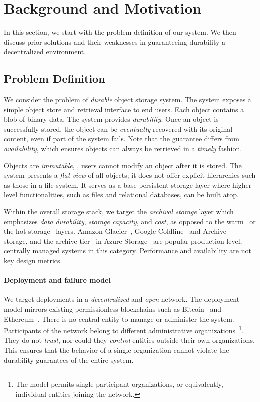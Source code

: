 \section{Background and Motivation}
\label{sec:background}

In this section, we start with the problem definition of our system.
We then discuss prior solutions and their weaknesses in guaranteeing durability a decentralized environment.

\subsection{Problem Definition}
\label{sec:background:problem}

We consider the problem of \emph{durable} object storage system.
The system exposes a simple object store and retrieval interface to end users.
Each object contains a blob of binary data.
The system provides \emph{durability}: Once an object is successfully stored, the object can be \emph{eventually} recovered with its original content, even if part of the system fails.
Note that the guarantee differs from \emph{availability}, which ensures objects can always be retrieved in a \emph{timely} fashion.

Objects are \emph{immutable}, \ie, users cannot modify an object after it is stored.
The system presents a \emph{flat view} of all objects;
it does not offer explicit hierarchies such as those in a file system.
It serves as a base persistent storage layer where higher-level functionalities, such as files and relational databases, can be built atop.

Within the overall storage stack, we target the \emph{archival storage} layer which emphasizes \emph{data durability}, \emph{storage capacity}, and \emph{cost}, as opposed to the warm~\cite{f4} or the hot storage~\cite{haystack} layers.
Amazon Glacier~\cite{amazon_glacier,amazon_s3}, Google Coldline~\cite{google_coldline} and Archive~\cite{google_archive} storage, and the archive tier~\cite{azure_tier} in Azure Storage~\cite{azure_storage} are popular production-level, centrally managed systems in this category.
Performance and availability are not key design metrics.

\paragraph{\textbf{Deployment and failure model}}
We target deployments in a \emph{decentralized} and \emph{open} network.
The deployment model mirrors existing permissionless blockchains such as Bitcoin~\cite{bitcoin} and Ethereum~\cite{ethereum}.
There is no central entity to manage or administer the system.
Participants of the network belong to different administrative organizations~\footnote{The model permits single-participant-organizations, or equivalently, individual entities joining the network.}.
They do not \emph{trust}, nor could they \emph{control} entities outside their own organizations.
This ensures that the behavior of a single organization cannot violate the durability guarantees of the entire system.

